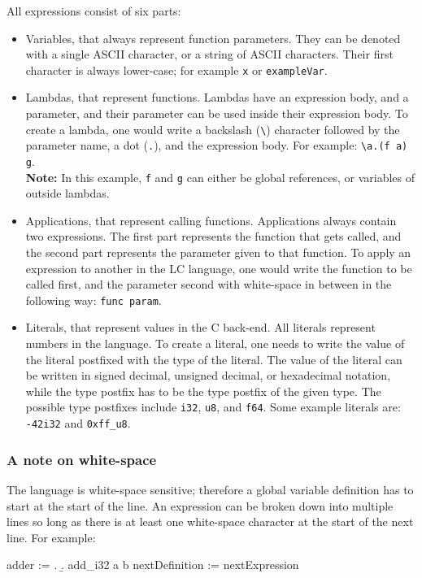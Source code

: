 \documentclass[12pt]{article}
\begin{document}
All expressions consist of six parts:
\begin{itemize}
    \item Variables, that always represent function parameters. They can be
        denoted with a single ASCII character, or a string of ASCII characters.
        Their first character is always lower-case; for example \texttt{x} or
        \texttt{exampleVar}.
    \item Lambdas, that represent functions. Lambdas have an expression body,
        and a parameter, and their parameter can be used inside their expression
        body. To create a lambda, one would write a backslash (\verb$\$)
        character followed by the parameter name, a dot (\verb$.$), and the
        expression body. For example: \verb$\a.(f a) g$. \\ \textbf{Note:} In
        this example, \verb$f$ and \verb$g$ can either be global references, or
        variables of outside lambdas.
    \item Applications, that represent calling functions. Applications always
        contain two expressions. The first part represents the function that
        gets called, and the second part represents the parameter given to that
        function. To apply an expression to another in the LC language, one
        would write the function to be called first, and the parameter second
        with white-space in between in the following way: \verb$func param$.
    \item Literals, that represent values in the C back-end. All literals
        represent numbers in the language. To create a literal, one needs to
        write the value of the literal postfixed with the type of the literal.
        The value of the literal can be written in signed decimal, unsigned
        decimal, or hexadecimal notation, while the type postfix has to be the
        type postfix of the given type. The possible type postfixes include
        \verb$i32$, \verb$u8$, and \verb$f64$. Some example literals are:
        \verb$-42i32$ and \verb$0xff_u8$.
\end{itemize}

\subsubsection{A note on white-space}

The language is white-space sensitive; therefore a global variable definition
has to start at the start of the line. An expression can be broken down into
multiple lines so long as there is at least one white-space character at the
start of the next line. For example:
\begin{verbatim*}
adder := \a. \b.
 add_i32 a
         b
nextDefinition := nextExpression
\end{verbatim*}
\end{document}
